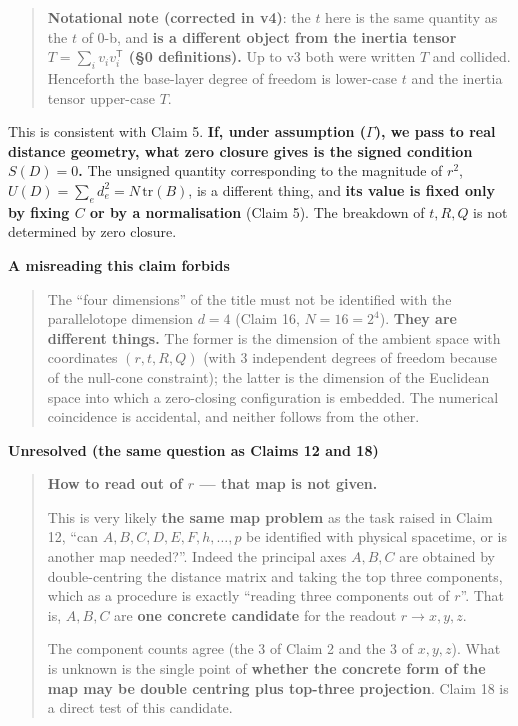 \documentclass[
  10pt,
]{article}
\begin{document}
\begin{quote}
\textbf{Notational note (corrected in v4)}: the \(t\) here is the same
quantity as the \(t\) of 0-b, and \textbf{is a different object from the
inertia tensor \(T = \sum_i v_iv_i^{\mathsf T}\) (§0 definitions).} Up
to v3 both were written \(T\) and collided. Henceforth the base-layer
degree of freedom is lower-case \(t\) and the inertia tensor upper-case
\(T\).
\end{quote}

This is consistent with Claim 5. \textbf{If, under assumption
(\(\Gamma\)), we pass to real distance geometry, what zero closure gives
is the signed condition \(S(D)=0\).} The unsigned quantity corresponding
to the magnitude of \(r^2\),
\(U(D) = \sum_e d_e^2 = N\,\mathrm{tr}(B)\), is a different thing, and
\textbf{its value is fixed only by fixing \(C\) or by a normalisation}
(Claim 5). The breakdown of \(t, R, Q\) is not determined by zero
closure.

\textbf{A misreading this claim forbids}

\begin{quote}
The ``four dimensions'' of the title must not be identified with the
parallelotope dimension \(d = 4\) (Claim 16, \(N = 16 = 2^4\)).
\textbf{They are different things.} The former is the dimension of the
ambient space with coordinates \((r,t,R,Q)\) (with 3 independent degrees
of freedom because of the null-cone constraint); the latter is the
dimension of the Euclidean space into which a zero-closing configuration
is embedded. The numerical coincidence is accidental, and neither
follows from the other.
\end{quote}

\textbf{Unresolved (the same question as Claims 12 and 18)}

\begin{quote}
\textbf{How to read out of \(r\) --- that map is not given.}

This is very likely \textbf{the same map problem} as the task raised in
Claim 12, ``can \(A,B,C,D,E,F,h,\dots,p\) be identified with physical
spacetime, or is another map needed?''. Indeed the principal axes
\(A, B, C\) are obtained by double-centring the distance matrix and
taking the top three components, which as a procedure is exactly
``reading three components out of \(r\)''. That is, \(A, B, C\) are
\textbf{one concrete candidate} for the readout \(r \to x, y, z\).

The component counts agree (the 3 of Claim 2 and the 3 of \(x,y,z\)).
What is unknown is the single point of \textbf{whether the concrete form
of the map may be double centring plus top-three projection}. Claim 18
is a direct test of this candidate.
\end{quote}
\end{document}
